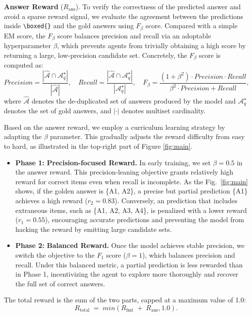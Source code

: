 \textbf{Answer Reward} ($R_{\text{ans}}$). To verify the correctness of the predicted answer and avoid a sparse reward signal, we evaluate the agreement between the predictions inside \verb|\boxed{}| and the gold answers using $F_\beta$ score. Compared with a simple EM score, the $F_\beta$ score balances precision and recall via an adoptable hyperparameter $\beta$, which prevents agents from trivially obtaining a high score by returning a large, low-precision candidate set. Concretely, the $F_\beta$ score is computed as:\begin{equation}Precision=\frac{|\widehat{\mathcal{A}}\cap \mathcal{A}_q^\star|}{|\widehat{\mathcal{A}}|},\quad Recall =\frac{|\widehat{\mathcal{A}}\cap \mathcal{A}_q^\star|}{|\mathcal{A}_q^\star|},\quad F_{\beta}=\frac{(1+\beta^2) \cdot Precision \cdot Recall }{\beta^2  \cdot Precision + Recall },\end{equation}
where $\widehat{\mathcal{A}}$ denotes the de-duplicated set of answers produced by the model and $\mathcal{A}_q^\star$ denotes the set of gold answers, and $|\cdot|$ denotes multiset cardinality.

Based on the answer reward, we employ a curriculum learning strategy by adapting the $\beta$ parameter. This gradually adjusts the reward difficulty from easy to hard, as illustrated in the top-right part of Figure \ref{fig:main}.
\begin{itemize}
    \item \textbf{Phase 1: Precision-focused Reward.} In early training, we set $\beta=0.5$ in the answer reward. This precision-leaning objective grants relatively high reward for correct items even when recall is incomplete. As the Fig.~\ref{fig:main} shows, if the golden answer is \{A1, A2\}, a precise but partial prediction \{A1\} achieves a high reward ($r_2=0.83$). Conversely, an prediction that includes extraneous items, such as \{A1, A2, A3, A4\}, is penalized with a lower reward ($r_1=0.55$), encouraging accurate predictions and preventing the model from hacking the reward by emitting large candidate sets.
    \item \textbf{Phase 2: Balanced Reward.} Once the model achieves stable precision, we switch the objective to the $F_1$ score ($\beta=1$), which balances precision and recall. Under this balanced metric, a partial prediction is less rewarded than in Phase 1, incentivizing the agent to explore more thoroughly and recover the full set of correct answers.
\end{itemize}
The total reward is the sum of the two parts, capped at a maximum value of 1.0:
\begin{equation}
R_{\text{total}} \;=\; min(R_{\text{fmt}} \;+\; R_{\text{ans}}, 1.0).    
\end{equation}
